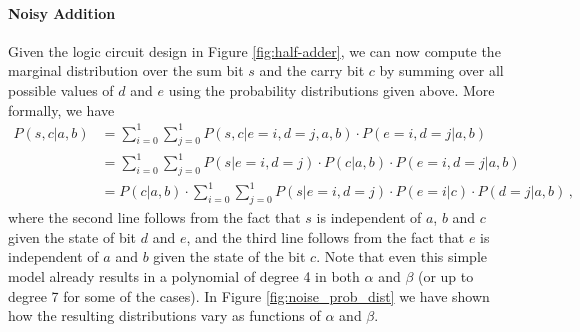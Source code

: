 \paragraph{Noisy Addition} Given the logic circuit design in Figure \ref{fig:half-adder}, we can now compute the marginal distribution over the sum bit $s$ and the carry bit $c$ by summing over all possible values of $d$ and $e$ using the probability distributions given above. More formally, we have 
\begin{align}
    P(s,c|a,b) & = \sum_{i=0}^1 \sum_{j=0}^1 P(s,c|e=i,d=j,a,b)\cdot P(e=i,d=j|a,b) \\
    & = \sum_{i=0}^1 \sum_{j=0}^1 P(s|e=i,d=j)\cdot P(c|a,b) \cdot P(e=i,d=j|a,b) \\
    & = P(c|a,b) \cdot \sum_{i=0}^1 \sum_{j=0}^1 P(s|e=i,d=j) \cdot P(e=i|c) \cdot P(d=j|a,b) \,,
\end{align}
where the second line follows from the fact that $s$ is independent of $a$, $b$ and $c$ given the state of bit $d$ and $e$, and the third line follows from the fact that $e$ is independent of $a$ and $b$ given the state of the bit $c$. Note that even this simple model already results in a polynomial of degree 4 in both $\alpha$ and $\beta$ (or up to degree 7 for some of the cases). In Figure \ref{fig:noise_prob_dist} we have shown how the resulting distributions vary as functions of $\alpha$ and $\beta$.
